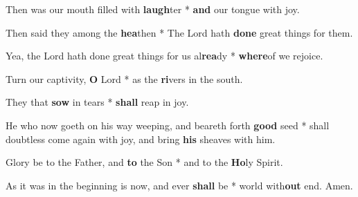 \begin{multicols}{2}
	Then was our mouth filled with \textbf{laugh}ter * \textbf{and} our tongue with joy.
	
	Then said they among the \textbf{hea}then * The Lord hath \textbf{done} great things for them.
	
	Yea, the Lord hath done great things for us al\textbf{rea}dy * \textbf{where}of we rejoice.
	
	Turn our captivity, \textbf{O} Lord * as the \textbf{ri}vers in the south.
	
	They that \textbf{sow} in tears * \textbf{shall} reap in joy.
	
	He who now goeth on his way weeping, and beareth forth \textbf{good} seed * shall doubtless come again with joy, and bring \textbf{his} sheaves with him.
	
	Glory be to the Father, and \textbf{to} the Son * and to the \textbf{Ho}ly Spirit.
	
	As it was in the beginning is now, and ever \textbf{shall} be * world with\textbf{out} end. Amen.
\end{multicols}